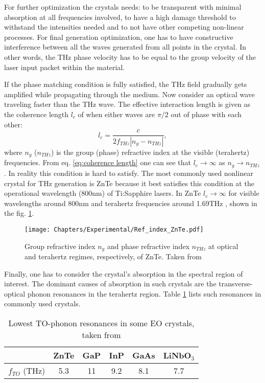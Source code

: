 For further optimization the crystals needs: to be transparent with minimal absorption at all frequencies involved, to have a high damage threshold to withstand the intensities needed and to not have other competing non-linear processes. For final generation optimization, one has to have constructive interference between all the waves generated from all points in the crystal. In other words, the THz phase velocity has to be equal to the group velocity of the laser input packet within the material.



If the phase matching condition is fully satisfied, the THz field gradually gets amplified while propagating through the medium. Now consider an optical wave traveling faster than the THz wave. The effective interaction length is given as the coherence length $l_c$ of when either waves are $\pi/2$ out of phase with each other:
\begin{equation}
l_c=\frac{c}{2f_{THz}|n_g-n_{THz}|},
\label{eq:coherence length}
\end{equation}
where $n_g$ ($n_{THz}$) is the group (phase) refractive index at the visible (terahertz) frequencies. From eq. \eqref{eq:coherence length} one can see that $l_c \to \infty$ as $n_g \to n_{THz}$. In reality this condition is hard to satisfy. The most commonly used nonlinear crystal for THz generation is ZnTe because it best satisfies this condition at the operational wavelength (800nm) of Ti:Sapphire lasers.  In ZnTe $l_c \to \infty$ for visible wavelengths around 800nm and terahertz frequencies around 1.69THz \cite{Nahata1996}, shown in the fig. \ref{fig:Ref_index_ZnTe}.
\begin{figure}[h!]\centering
\texttt{[image: Chapters/Experimental/Ref\_index\_ZnTe.pdf]}
\caption{Group refractive index $n_g$ and phase refractive index $n_{THz}$ at optical and terahertz regimes, respectively, of ZnTe. Taken from \cite{PrinciplesofTHz}}
\label{fig:Ref_index_ZnTe}
\end{figure}



Finally, one has to consider the crystal's absorption in the spectral region of interest. The dominant causes of absorption in such crystals are the transverse-optical phonon resonances in the terahertz region. Table \ref{tab:THz phonons} lists such resonances in commonly used crystals.
\begin{table}[h!]
\caption{Lowest TO-phonon resonances in some EO crystals, taken from \cite{PrinciplesofTHz}}
\centering
\begin{tabular} {l c c c c c}
\hline
 & ZnTe & GaP & InP &GaAs&LiNbO$_{3}$  \\
\hline
$f_{TO}$ (THz) & 5.3 & 11 & 9.2 & 8.1 & 7.7 \\
\hline
\end{tabular}
\label{tab:THz phonons}
\end{table}





